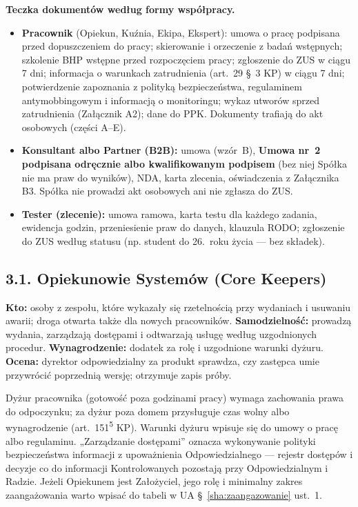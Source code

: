 \documentclass[11pt,a4paper]{report}
\newcommand{\UA}[1]{UA §~#1}
\begin{document}
\begin{DlaHR}
\textbf{Teczka dokumentów według formy współpracy.}
\begin{itemize}
  \item \textbf{Pracownik} (Opiekun, Kuźnia, Ekipa, Ekspert): umowa o pracę podpisana przed dopuszczeniem do pracy; skierowanie i orzeczenie z badań wstępnych; szkolenie BHP wstępne przed rozpoczęciem pracy; zgłoszenie do ZUS w ciągu 7 dni; informacja o warunkach zatrudnienia (art.~29 §~3 KP) w ciągu 7 dni; potwierdzenie zapoznania z polityką bezpieczeństwa, regulaminem antymobbingowym i informacją o monitoringu; wykaz utworów sprzed zatrudnienia (Załącznik A2); dane do PPK. Dokumenty trafiają do akt osobowych (części A--E).
  \item \textbf{Konsultant albo Partner (B2B):} umowa (wzór~B), \textbf{Umowa nr~2 podpisana odręcznie albo kwalifikowanym podpisem} (bez niej Spółka nie ma praw do wyników), NDA, karta zlecenia, oświadczenia z Załącznika B3. Spółka nie prowadzi akt osobowych ani nie zgłasza do ZUS.
  \item \textbf{Tester (zlecenie):} umowa ramowa, karta testu dla każdego zadania, ewidencja godzin, przeniesienie praw do danych, klauzula RODO; zgłoszenie do ZUS według statusu (np. student do 26.~roku życia --- bez składek).
\end{itemize}
\end{DlaHR}

\subsection*{3.1. Opiekunowie Systemów (Core Keepers)}
\textbf{Kto:} osoby z zespołu, które wykazały się rzetelnością przy wydaniach i usuwaniu awarii; droga otwarta także dla nowych pracowników. \textbf{Samodzielność:} prowadzą wydania, zarządzają dostępami i odtwarzają usługę według uzgodnionych procedur. \textbf{Wynagrodzenie:} dodatek za rolę i uzgodnione warunki dyżuru. \textbf{Ocena:} dyrektor odpowiedzialny za produkt sprawdza, czy zastępca umie przywrócić poprzednią wersję; otrzymuje zapis próby.
\begin{Prawo}
Dyżur pracownika (gotowość poza godzinami pracy) wymaga zachowania prawa do odpoczynku; za dyżur poza domem przysługuje czas wolny albo wynagrodzenie (art.~151\textsuperscript{5} KP). Warunki dyżuru wpisuje się do umowy o pracę albo regulaminu. „Zarządzanie dostępami” oznacza wykonywanie polityki bezpieczeństwa informacji z upoważnienia Odpowiedzialnego --- rejestr dostępów i decyzje co do informacji Kontrolowanych pozostają przy Odpowiedzialnym i Radzie. Jeżeli Opiekunem jest Założyciel, jego rolę i minimalny zakres zaangażowania warto wpisać do tabeli w \UA{\ref{sha:zaangazowanie} ust.~1}.
\end{Prawo}
\end{document}

